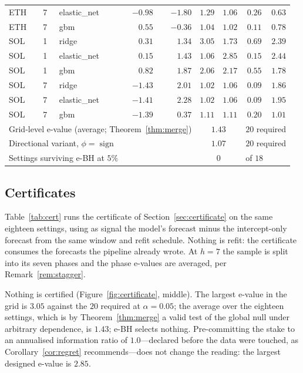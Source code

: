 \documentclass{article}
\theoremstyle{plain}
\theoremstyle{definition}
\begin{document}
\begin{table}[t]
\begin{tabular}{lllrrrrrr}
    ETH & 7 & elastic\_net & $-0.98$ & $-1.80$ & $1.29$ & $1.06$ & $0.26$ & $0.63$ \\
    ETH & 7 & gbm & $0.55$ & $-0.36$ & $1.04$ & $1.02$ & $0.11$ & $0.78$ \\
    SOL & 1 & ridge & $0.31$ & $1.34$ & $3.05$ & $1.73$ & $0.69$ & $2.39$ \\
    SOL & 1 & elastic\_net & $0.15$ & $1.43$ & $1.06$ & $2.85$ & $0.15$ & $2.44$ \\
    SOL & 1 & gbm & $0.82$ & $1.87$ & $2.06$ & $2.17$ & $0.55$ & $1.78$ \\
    SOL & 7 & ridge & $-1.43$ & $2.01$ & $1.02$ & $1.06$ & $0.09$ & $1.86$ \\
    SOL & 7 & elastic\_net & $-1.41$ & $2.28$ & $1.02$ & $1.06$ & $0.09$ & $1.95$ \\
    SOL & 7 & gbm & $-1.39$ & $0.37$ & $1.11$ & $1.11$ & $0.20$ & $1.01$ \\
    \midrule
    \multicolumn{5}{l}{Grid-level e-value (average; Theorem~\ref{thm:merge})}
      & \multicolumn{2}{c}{$1.43$} & \multicolumn{2}{l}{$20$ required} \\
    \multicolumn{5}{l}{Directional variant, $\phi=\operatorname{sign}$}
      & \multicolumn{2}{c}{$1.07$} & \multicolumn{2}{l}{$20$ required} \\
    \multicolumn{5}{l}{Settings surviving e-BH at $5\%$}
      & \multicolumn{2}{c}{$0$} & \multicolumn{2}{l}{of $18$} \\
    \bottomrule
  \end{tabular}
\end{table}

\subsection{Certificates}
\label{sec:results-cert}

Table~\ref{tab:cert} runs the certificate of Section~\ref{sec:certificate} on the same
eighteen settings, using as signal the model's forecast minus the intercept-only forecast
from the same window and refit schedule. Nothing is refit: the certificate consumes the
forecasts the pipeline already wrote. At $h=7$ the sample is split into its seven phases and
the phase e-values are averaged, per Remark~\ref{rem:stagger}.

Nothing is certified (Figure~\ref{fig:certificate}, middle). The largest e-value in the grid
is $3.05$ against the $20$ required at $\alpha=0.05$; the average over the eighteen settings,
which is by Theorem~\ref{thm:merge} a valid test of the global null under arbitrary
dependence, is $1.43$; e-BH selects nothing. Pre-committing the stake to an annualised
information ratio of $1.0$---declared before the data were touched, as
Corollary~\ref{cor:regret} recommends---does not change the reading: the largest designed
e-value is $2.85$.
\end{document}
